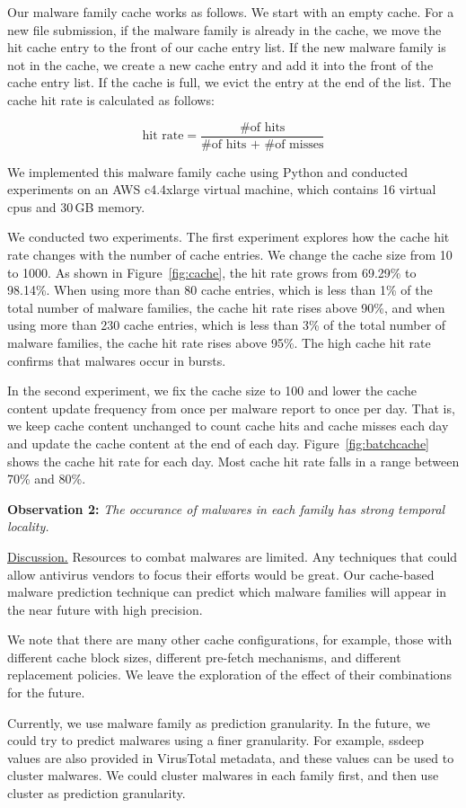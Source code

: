 Our malware family cache works as follows.
We start with an empty cache. 
For a new file submission, if the malware family is already in the cache, 
we move the hit cache entry to the front of our cache entry list. 
If the new malware family is not in the cache, 
we create a new cache entry and add it into the front of the cache entry list.
If the cache is full, we evict the entry at the end of the list. 
The cache hit rate is calculated as follows: 

$$ \mbox{hit rate} = \dfrac{\mbox{\# of hits}}{\mbox{\# of hits + \# of misses}}$$

We implemented this malware family cache using Python
and conducted experiments on an AWS c4.4xlarge virtual machine, 
which contains 16 virtual cpus and 30\,GB memory.

We conducted two experiments. 
The first experiment explores how the cache hit rate changes with the number of cache entries. 
We change the cache size from 10 to 1000. 
As shown in Figure~\ref{fig:cache}, the hit rate grows from 69.29\% to 98.14\%. 
When using more than 80 cache entries, which is less than 1\% of the total number of malware families, the cache hit rate rises above 90\%, 
and when using more than 230 cache entries, which is less than 3\% of the total number of malware families, 
the cache hit rate rises above 95\%. 
The high cache hit rate confirms that malwares occur in bursts.

In the second experiment, we fix the cache size to 100 
and lower the cache content update frequency from once per malware report to once per day.
That is, we keep cache content unchanged to count cache hits and cache misses each day and update the cache content at the end of each day.
Figure~\ref{fig:batchcache} shows the cache hit rate for each day. 
Most cache hit rate falls in a range between 70\% and 80\%.  

{\bf Observation 2:} 
{\em The occurance of malwares in each family has strong temporal locality.}  

\underline{Discussion.}
Resources to combat malwares are limited. 
Any techniques that could allow antivirus vendors to focus their efforts would be great. 
Our cache-based malware prediction technique can predict which malware families will appear in the near future with high precision. 

We note that there are many other cache configurations, for example, those
with different cache block sizes, different pre-fetch mechanisms, 
and different replacement policies. 
We leave the exploration of the effect of their combinations for the future. 

Currently, we use malware family as prediction granularity. 
In the future, we could try to predict malwares using a finer granularity. 
For example, ssdeep values are also provided in VirusTotal metadata, 
and these values can be used to cluster malwares. 
We could cluster malwares in each family first, and then use cluster as prediction granularity. 
